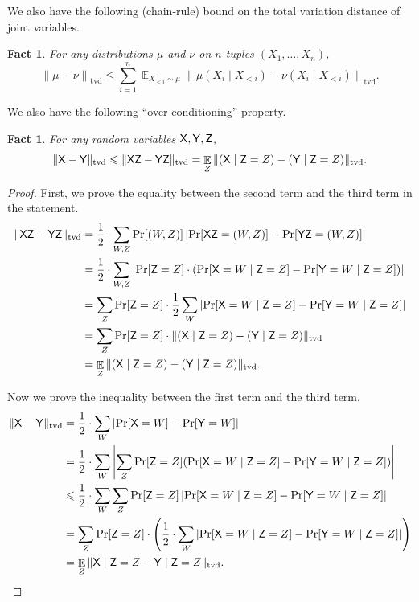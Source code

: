 \documentclass[11pt]{article}
\newtheorem{fact}[lemma]{Fact}
\theoremstyle{definition}
\renewcommand{\leq}{\leqslant}
\newcommand{\tvd}[2]{\ensuremath{\norm{#1 - #2}_{\mathrm{tvd}}}}
\newcommand{\paren}[1]{\ensuremath{\left(#1\right)}\xspace}
\newcommand{\card}[1]{\left\vert{#1}\right\vert}
\newcommand{\norm}[1]{\ensuremath{\|#1\|}}
\DeclareMathOperator*{\Exp}{\ensuremath{{\mathbb{E}}}}
\DeclareMathOperator*{\Prob}{\ensuremath{\textnormal{Pr}}}
\renewcommand{\Pr}{\Prob}
\newcommand{\rv}[1]{\ensuremath{{\mathsf{#1}}}\xspace}
\newcommand{\rX}{\rv{X}}
\newcommand{\rY}{\rv{Y}}
\begin{document}


We also have the following (chain-rule) bound on the total variation distance of joint variables.

\begin{fact}\label{fact:tvd-chain-rule}
	For any distributions $\mu$ and $\nu$ on $n$-tuples $(X_1,\ldots,X_n)$, 
	\[
		\tvd{\mu}{\nu} \leq \sum_{i=1}^{n} \Exp_{X_{<i} \sim \mu} \tvd{\mu(X_i \mid X_{<i})}{\nu(X_i \mid X_{<i})}. 
	\]
\end{fact}

We also have the following ``over conditioning'' property. 

\begin{fact}\label{fact:tvd-over-conditioning}
	For any random variables $\rX,\rY,\rZ$, 
	\[
		\tvd{\rX}{\rY} \leq \tvd{\rX\rZ}{\rY\rZ} = \Exp_{Z} \tvd{(\rX \mid \rZ=Z)}{(\rY \mid \rZ=Z)}.  
	\]
\end{fact}
\begin{proof}
First, we prove the equality between the second term and the third term in the statement. 
\begin{align*}
	\tvd{\rX\rZ}{\rY\rZ} &=\frac12 \cdot \sum_{W, Z} \Pr[(W, Z)] \card{\Pr[\rX\rZ = (W, Z)] - \Pr[\rY\rZ=(W, Z)]}  \\
	&=\frac12 \cdot \sum_{W, Z}  \card{\Pr[\rZ = Z] \cdot (\Pr[\rX = W \mid  \rZ = Z] - \Pr[\rY = W \mid \rZ= Z])} \\
	&= \sum_{Z} \Pr[\rZ =Z] \cdot \frac12 \sum_{W}  \card{\Pr[\rX = W \mid  \rZ = Z] - \Pr[\rY = W \mid \rZ= Z]} \\
	&= \sum_{Z} \Pr[\rZ =Z] \cdot\tvd{(\rX \mid \rZ= Z)}{(\rY \mid \rZ = Z)} \\
	&= \Exp_{Z} \tvd{(\rX \mid \rZ= Z)}{(\rY \mid \rZ = Z)}.
\end{align*}

Now we prove the inequality between the first term and the third term. 
\begin{align*}
		\tvd{\rX}{\rY} &= \frac12 \cdot \sum_{W} \card{\Pr[\rX = W] - \Pr[\rY = W]} \\
		&= \frac12 \cdot \sum_{W} \card{\sum_{Z} \Pr[\rZ = Z](\Pr[\rX = W \mid \rZ = Z] - \Pr[\rY = W \mid \rZ = Z])} \\
		& \leq  \frac12 \cdot \sum_{W}  \sum_{Z} \Pr[\rZ = Z] \card{\Pr[\rX = W \mid \rZ = Z] - \Pr[\rY = W \mid \rZ = Z]} \\
		&= \sum_{Z}   \Pr[\rZ = Z] \cdot \paren{\frac12 \cdot \sum_{W} \card{\Pr[\rX = W \mid \rZ = Z] - \Pr[\rY = W \mid \rZ = Z]}}  \\
		&= \Exp_{Z} \tvd{\rX \mid \rZ= Z}{\rY \mid \rZ = Z}. \qedhere
\end{align*}
\end{proof}
\end{document}
